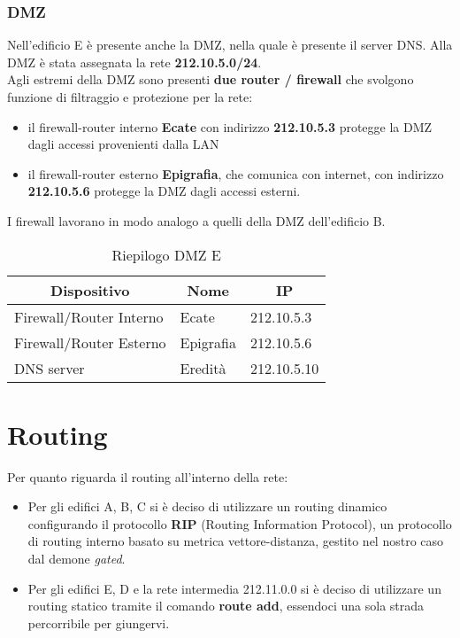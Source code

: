 \documentclass[a4paper,11pt]{article}
\begin{document}
\subsubsection{DMZ}
Nell’edificio E è presente anche la DMZ, nella quale è presente il server DNS. Alla DMZ è stata assegnata la rete \textbf{212.10.5.0/24}.\\
Agli estremi della DMZ sono presenti \textbf{due router / firewall} che svolgono funzione di filtraggio e protezione per la rete: 
\begin{itemize}
\item il firewall-router interno \textbf{Ecate} con indirizzo \textbf{212.10.5.3}  protegge la DMZ dagli accessi provenienti dalla LAN
\item il firewall-router esterno \textbf{Epigrafia}, che comunica con internet, con indirizzo \textbf{212.10.5.6} protegge la DMZ dagli accessi esterni.
\end{itemize}
I firewall lavorano in modo analogo a quelli della DMZ dell'edificio B.


\begin{table}[H]
\centering
\label{riepilogo}
\begin{tabular}{|l|l|l|}
\hline
\multicolumn{1}{|c|}{\textbf{Dispositivo}} & \multicolumn{1}{c|}{\textbf{Nome}} & \multicolumn{1}{c|}{\textbf{IP}} \\ \hline
Firewall/Router Interno & Ecate & 212.10.5.3 \\ \hline
Firewall/Router Esterno & Epigrafia & 212.10.5.6 \\ \hline
DNS server & Eredità & 212.10.5.10 \\ \hline
\end{tabular}
\caption{Riepilogo DMZ E}
\end{table}
\newpage

\section{Routing}
Per quanto riguarda il routing all'interno della rete:
\begin{itemize}
\item Per gli edifici A, B, C si è deciso di utilizzare un routing dinamico configurando il protocollo \textbf{RIP} (Routing Information Protocol), un protocollo di routing interno basato su metrica vettore-distanza, gestito nel nostro caso dal demone \textit{gated}.
\item Per gli edifici E, D e la rete intermedia 212.11.0.0 si è deciso di utilizzare un routing statico tramite il comando \textbf{route add}, essendoci una sola strada percorribile per giungervi.
\end{itemize}
\end{document}
